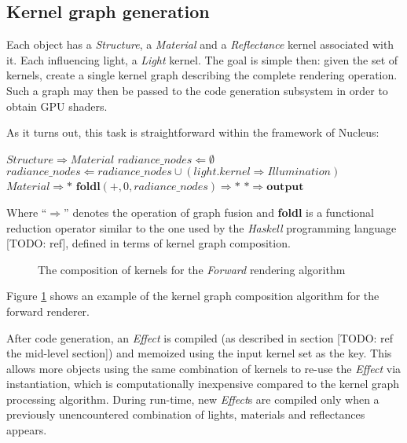 \subsection{Kernel graph generation}

Each object has a \emph{Structure}, a \emph{Material} and a \emph{Reflectance} kernel associated with it. Each influencing light, a \emph{Light} kernel. The goal is simple then: given the set of kernels, create a single kernel graph describing the complete rendering operation. Such a graph may then be passed to the code generation subsystem in order to obtain GPU shaders.

As it turns out, this task is straightforward within the framework of Nucleus:
	
\begin{algorithmic}
\STATE $Structure \Rightarrow Material$
\STATE $radiance\_nodes \Leftarrow \emptyset$
	\STATE $radiance\_nodes \Leftarrow radiance\_nodes \cup (light.kernel \Rightarrow Illumination)$
\ENDFOR
\STATE $Material \Rightarrow *$
\STATE $\textbf{foldl}(+, 0,radiance\_nodes) \Rightarrow *$
\STATE $* \Rightarrow \textbf{output}$
\end{algorithmic}

Where ``$\Rightarrow$'' denotes the operation of graph fusion and \textbf{foldl} is a functional reduction operator similar to the one used by the \emph{Haskell} programming language [TODO: ref], defined in terms of kernel graph composition.

\begin{figure}[h!]
  \centering
    \caption[Forward rendering graph]{The composition of kernels for the \emph{Forward} rendering algorithm}
  \label{fig:ForwardRenderingGraphSample}
\end{figure}

Figure \ref{fig:ForwardRenderingGraphSample} shows an example of the kernel graph composition algorithm for the forward renderer.

After code generation, an \emph{Effect} is compiled (as described in section [TODO: ref the mid-level section]) and memoized using the input kernel set as the key. This allows more objects using the same combination of kernels to re-use the \emph{Effect} via instantiation, which is computationally inexpensive compared to the kernel graph processing algorithm. During run-time, new \emph{Effect}s are compiled only when a previously unencountered combination of lights, materials and reflectances appears.

